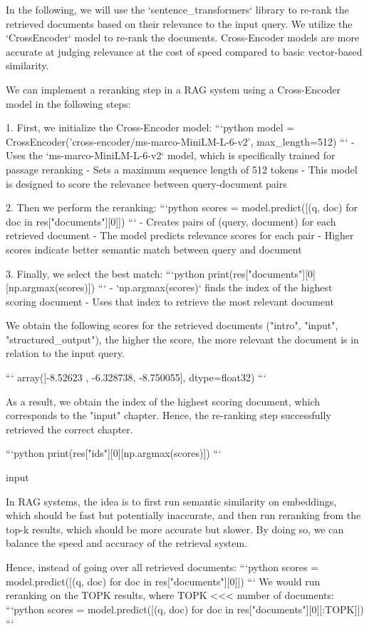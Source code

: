 {{In the following, we will use the `sentence_transformers` library to re-rank the retrieved documents based on their relevance to the input query. We utilize the `CrossEncoder` model to re-rank the documents. Cross-Encoder models are more accurate at judging relevance at the cost of speed compared to basic vector-based similarity. 

We can implement a reranking step in a RAG system using a Cross-Encoder model in the following steps:

1. First, we initialize the Cross-Encoder model:
```python
model = CrossEncoder('cross-encoder/ms-marco-MiniLM-L-6-v2', max_length=512)
```
- Uses the `ms-marco-MiniLM-L-6-v2` model, which is specifically trained for passage reranking
- Sets a maximum sequence length of 512 tokens
- This model is designed to score the relevance between query-document pairs

2. Then we perform the reranking:
```python
scores = model.predict([(q, doc) for doc in res["documents"][0]])
```
- Creates pairs of (query, document) for each retrieved document
- The model predicts relevance scores for each pair
- Higher scores indicate better semantic match between query and document

3. Finally, we select the best match:
```python
print(res["documents"][0][np.argmax(scores)])
```
- `np.argmax(scores)` finds the index of the highest scoring document
- Uses that index to retrieve the most relevant document


We obtain the following scores for the retrieved documents ("intro", "input", "structured_output"), the higher the score, the more relevant the document is in relation to the input query.

```
array([-8.52623 , -6.328738, -8.750055], dtype=float32)
```

As a result, we obtain the index of the highest scoring document, which corresponds to the "input" chapter. Hence, the re-ranking step successfully retrieved the correct chapter.


```python
print(res["ids"][0][np.argmax(scores)])
```

    input


In RAG systems, the idea is to first run semantic similarity on embeddings, which should be fast but potentially inaccurate, and then run reranking from the top-k results, which should be more accurate but slower. By doing so, we can balance the speed and accuracy of the retrieval system.

Hence, instead of going over all retrieved documents:
```python
scores = model.predict([(q, doc) for doc in res["documents"][0]])
```
We would run reranking on the TOPK results, where TOPK <<< number of documents:
```python
scores = model.predict([(q, doc) for doc in res["documents"][0][:TOPK]])
```

}}
